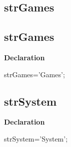 \documentclass{report}
\newif\ifpdf
\begin{document}
\subsection*{\large{\textbf{strGames}}\normalsize\hspace{1ex}\hrulefill}
\else
\subsection*{strGames}
\fi
\label{trstrings-strGames}
\begin{list}{}{
\setlength{\itemindent}{0cm}
\setlength{\listparindent}{0cm}
\setlength{\leftmargin}{\evensidemargin}
\addtolength{\leftmargin}{\tmplength}
\settowidth{\labelsep}{X}
\addtolength{\leftmargin}{\labelsep}
\setlength{\labelwidth}{\tmplength}
}
\item[\textbf{Declaration}\hfill]
\ifpdf
\begin{flushleft}
\fi
\begin{ttfamily}
strGames='Games';\end{ttfamily}

\ifpdf
\end{flushleft}
\fi

\end{list}
\ifpdf
\subsection*{\large{\textbf{strSystem}}\normalsize\hspace{1ex}\hrulefill}
\else
\subsection*{strSystem}
\fi
\label{trstrings-strSystem}
\begin{list}{}{
\setlength{\itemindent}{0cm}
\setlength{\listparindent}{0cm}
\setlength{\leftmargin}{\evensidemargin}
\addtolength{\leftmargin}{\tmplength}
\settowidth{\labelsep}{X}
\addtolength{\leftmargin}{\labelsep}
\setlength{\labelwidth}{\tmplength}
}
\item[\textbf{Declaration}\hfill]
\ifpdf
\begin{flushleft}
\fi
\begin{ttfamily}
strSystem='System';\end{ttfamily}

\ifpdf
\end{flushleft}
\fi

\end{list}
\ifpdf
\end{document}
